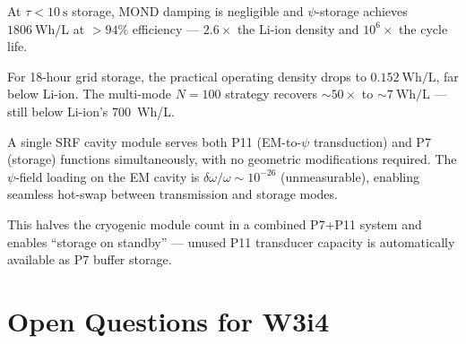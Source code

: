 \documentclass[aps,prd,twocolumn,superscriptaddress]{revtex4-2}
\begin{document}
\begin{tcolorbox}[colback=yellow!5!white,colframe=orange!75!black,title=
{W3i3 Finding \#4: Psi-Storage Technology Niche is Short-Duration, High-Cycle}]
At $\tau < 10~\mathrm{s}$ storage, MOND damping is negligible and
$\psi$-storage achieves $1806~\mathrm{Wh/L}$ at $>94\%$ efficiency ---
$2.6\times$ the Li-ion density and $10^6\times$ the cycle life.

For 18-hour grid storage, the practical operating density drops to
$0.152~\mathrm{Wh/L}$, far below Li-ion.  The multi-mode $N = 100$
strategy recovers $\sim 50\times$ to $\sim 7~\mathrm{Wh/L}$ ---
still below Li-ion's 700~Wh/L.
\end{tcolorbox}

\begin{tcolorbox}[colback=purple!5!white,colframe=purple!75!black,title=
{W3i3 Finding \#5: P7+P11 Dual-Function Cavity Eliminates Need for Separate Components}]
A single SRF cavity module serves both P11 (EM-to-$\psi$ transduction)
and P7 (storage) functions simultaneously, with no geometric
modifications required.  The $\psi$-field loading on the EM cavity
is $\delta\omega/\omega \sim 10^{-26}$ (unmeasurable), enabling
seamless hot-swap between transmission and storage modes.

This halves the cryogenic module count in a combined P7+P11 system
and enables ``storage on standby'' --- unused P11 transducer capacity
is automatically available as P7 buffer storage.
\end{tcolorbox}

\section{Open Questions for W3i4}
\label{sec:open}
\end{document}
